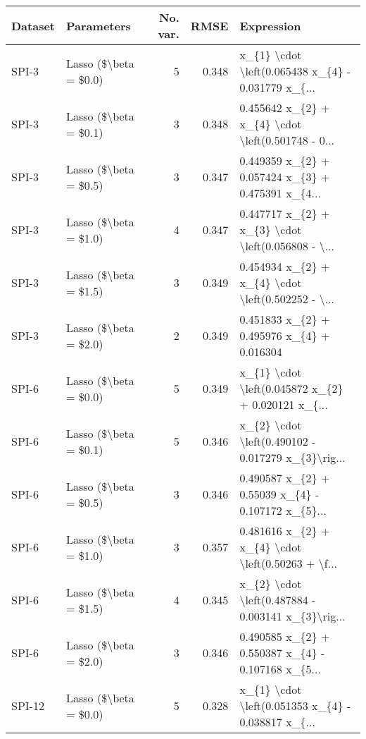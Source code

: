 \begin{tabular}{llrrl}
\toprule
Dataset &            Parameters &  No. var. &  RMSE &                                         Expression \\
\midrule
  SPI-3 & Lasso (\$\textbackslash beta = \$0.0) &         5 & 0.348 & x\_\{1\} \textbackslash cdot \textbackslash left(0.065438 x\_\{4\} - 0.031779 x\_\{... \\
  SPI-3 & Lasso (\$\textbackslash beta = \$0.1) &         3 & 0.348 & 0.455642 x\_\{2\} + x\_\{4\} \textbackslash cdot \textbackslash left(0.501748 - 0... \\
  SPI-3 & Lasso (\$\textbackslash beta = \$0.5) &         3 & 0.347 & 0.449359 x\_\{2\} + 0.057424 x\_\{3\} + 0.475391 x\_\{4... \\
  SPI-3 & Lasso (\$\textbackslash beta = \$1.0) &         4 & 0.347 & 0.447717 x\_\{2\} + x\_\{3\} \textbackslash cdot \textbackslash left(0.056808 - \textbackslash ... \\
  SPI-3 & Lasso (\$\textbackslash beta = \$1.5) &         3 & 0.349 & 0.454934 x\_\{2\} + x\_\{4\} \textbackslash cdot \textbackslash left(0.502252 - \textbackslash ... \\
  SPI-3 & Lasso (\$\textbackslash beta = \$2.0) &         2 & 0.349 &         0.451833 x\_\{2\} + 0.495976 x\_\{4\} + 0.016304 \\
  SPI-6 & Lasso (\$\textbackslash beta = \$0.0) &         5 & 0.349 & x\_\{1\} \textbackslash cdot \textbackslash left(0.045872 x\_\{2\} + 0.020121 x\_\{... \\
  SPI-6 & Lasso (\$\textbackslash beta = \$0.1) &         5 & 0.346 & x\_\{2\} \textbackslash cdot \textbackslash left(0.490102 - 0.017279 x\_\{3\}\textbackslash rig... \\
  SPI-6 & Lasso (\$\textbackslash beta = \$0.5) &         3 & 0.346 & 0.490587 x\_\{2\} + 0.55039 x\_\{4\} - 0.107172 x\_\{5\}... \\
  SPI-6 & Lasso (\$\textbackslash beta = \$1.0) &         3 & 0.357 & 0.481616 x\_\{2\} + x\_\{4\} \textbackslash cdot \textbackslash left(0.50263 + \textbackslash f... \\
  SPI-6 & Lasso (\$\textbackslash beta = \$1.5) &         4 & 0.345 & x\_\{2\} \textbackslash cdot \textbackslash left(0.487884 - 0.003141 x\_\{3\}\textbackslash rig... \\
  SPI-6 & Lasso (\$\textbackslash beta = \$2.0) &         3 & 0.346 & 0.490585 x\_\{2\} + 0.550387 x\_\{4\} - 0.107168 x\_\{5... \\
 SPI-12 & Lasso (\$\textbackslash beta = \$0.0) &         5 & 0.328 & x\_\{1\} \textbackslash cdot \textbackslash left(0.051353 x\_\{4\} - 0.038817 x\_\{... \\

\end{tabular}
